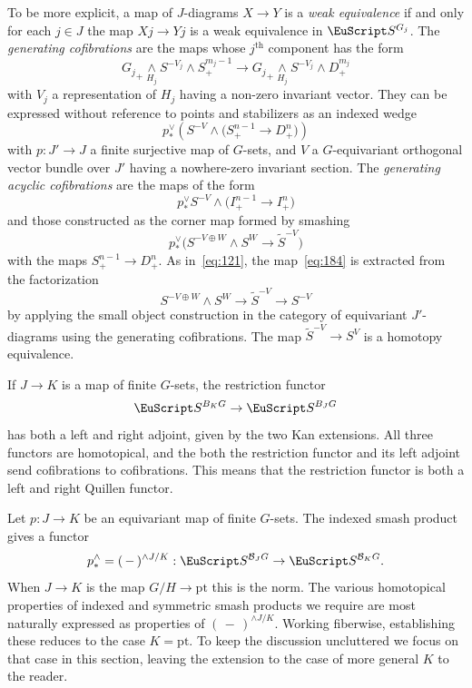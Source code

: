 \documentclass{amsart}
\theoremstyle{definition}
\theoremstyle{remark}
\newcommand{\slot}{\,-\,}
\newcommand{\spectra}{\EuScript S}
\newcommand{\ugspectra}[1]{\spectra^{#1}}
\newcommand{\cat}[1]{{\mathcal #1}}
\begin{document}
To be more explicit, a map of $J$-diagrams $X\to Y$ is a
{\em weak equivalence} if and only for each $j\in J$ the map $Xj\to
Yj$ is a weak equivalence in $\ugspectra{G_{j}}$.  The {\em generating
cofibrations} are the maps whose $j^{\text{th}}$ component has the
form
\[
{G_{j}}_{+}\underset{H_{j}}{\wedge}{S^{-V_{j}}}\wedge S^{m_{j}-1}_{+} \to
{G_{j}}_{+}\underset{H_{j}}{\wedge}{S^{-V_{j}}}\wedge D^{m_{j}}_{+}
\]
with $V_{j}$ a representation of $H_{j}$ having a non-zero invariant
vector.   They can be expressed without reference to points and
stabilizers as an indexed wedge
\begin{equation}
\label{eq:181}
p^{\vee}_{\ast}\left(S^{-V}\wedge \big(S^{n-1}_{+}\to  D^{n}_{+}\big)\right)
\end{equation}
with $p:J'\to J$ a finite surjective map of $G$-sets, and $V$ a
$G$-equivariant orthogonal vector bundle over $J'$ having a
nowhere-zero invariant section.  The {\em generating acyclic
cofibrations} are the maps of the form
\[
p^{\vee}_{\ast}S^{-V}\wedge\big(I^{n-1}_{+}\to  I^{n}_{+}\big)
\]
and those constructed as the corner map formed by smashing 
\begin{equation}
\label{eq:184}
p^{\vee}_{\ast}\big(S^{-V\oplus W}\wedge S^{W}\to \tilde S^{-V}\big)
\end{equation}
with the maps $S^{n-1}_{+}\to D^{n}_{+}$.  As in~\eqref{eq:121}, the
map~\eqref{eq:184} is extracted from the factorization
\begin{equation}
\label{eq:185}
S^{-V\oplus W}\wedge S^{W}\to \tilde S^{-V} \to S^{-V}
\end{equation}
by applying the small object construction in the category of
equivariant $J'$-diagrams using the generating cofibrations.  The map
$\tilde S^{-V}\to S^{V}$ is a homotopy equivalence.  

If $J\to K$ is a map of finite $G$-sets, the restriction
functor 
\[
\spectra^{B_{K}G} \to
\spectra^{B_{J}G} 
\]
has both a left and right adjoint, given by the two Kan extensions.
All three functors are homotopical, and the both the restriction
functor and its left adjoint send cofibrations to cofibrations.  This
means that the restriction functor is both a left and right Quillen
functor.

Let $p:J\to K$ be an equivariant map of finite $G$-sets.   The indexed
smash product gives a functor
\[
p^{\wedge}_{\ast}=(\slot)^{\wedge J/K}:\spectra^{\cat B_{J}G} \to \spectra^{\cat B_{K}G}.
\]
When $J\to K$ is the map $G/H\to\text{pt}$ this is the norm.  The
various homotopical properties of indexed and symmetric smash products
we require are most naturally expressed as properties of
$(\slot)^{\wedge J/K}$.  Working fiberwise, establishing these reduces
to the case $K=\text{pt}$.  To keep the discussion uncluttered we
focus on that case in this section, leaving the extension to the case
of more general $K$ to the reader.
\end{document}
